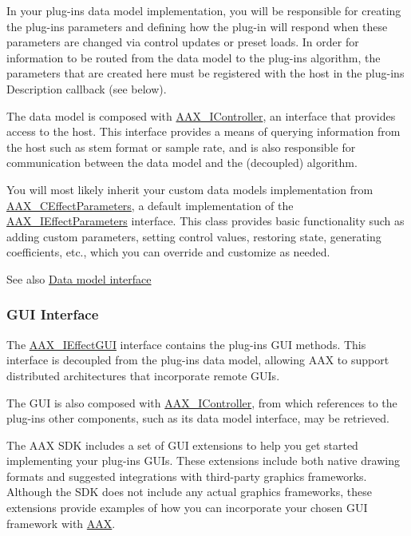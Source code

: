 In your plug-\/in\textquotesingle{}s data model implementation, you will be responsible for creating the plug-\/in\textquotesingle{}s parameters and defining how the plug-\/in will respond when these parameters are changed via control updates or preset loads. In order for information to be routed from the data model to the plug-\/in\textquotesingle{}s algorithm, the parameters that are created here must be registered with the host in the plug-\/in\textquotesingle{}s Description callback (see below).

The data model is composed with \hyperlink{a00090}{A\+A\+X\+\_\+\+I\+Controller}, an interface that provides access to the host. This interface provides a means of querying information from the host such as stem format or sample rate, and is also responsible for communication between the data model and the (decoupled) algorithm.

You will most likely inherit your custom data model\textquotesingle{}s implementation from \hyperlink{a00018}{A\+A\+X\+\_\+\+C\+Effect\+Parameters}, a default implementation of the \hyperlink{a00099}{A\+A\+X\+\_\+\+I\+Effect\+Parameters} interface. This class provides basic functionality such as adding custom parameters, setting control values, restoring state, generating coefficients, etc., which you can override and customize as needed.

 \begin{DoxySeeAlso}{See also}
\hyperlink{a00328}{Data model interface}
\end{DoxySeeAlso}
\hypertarget{a00324_subsection__gui_interface}{}\subsubsection{G\+U\+I Interface}\label{a00324_subsection__gui_interface}
The \hyperlink{a00098}{A\+A\+X\+\_\+\+I\+Effect\+G\+U\+I} interface contains the plug-\/in\textquotesingle{}s G\+U\+I methods. This interface is decoupled from the plug-\/in\textquotesingle{}s data model, allowing A\+A\+X to support distributed architectures that incorporate remote G\+U\+Is.

The G\+U\+I is also composed with \hyperlink{a00090}{A\+A\+X\+\_\+\+I\+Controller}, from which references to the plug-\/in\textquotesingle{}s other components, such as its data model interface, may be retrieved.

The A\+A\+X S\+D\+K includes a set of G\+U\+I extensions to help you get started implementing your plug-\/ins\textquotesingle{} G\+U\+Is. These extensions include both native drawing formats and suggested integrations with third-\/party graphics frameworks. Although the S\+D\+K does not include any actual graphics frameworks, these extensions provide examples of how you can incorporate your chosen G\+U\+I framework with \hyperlink{a00288}{A\+A\+X}.

